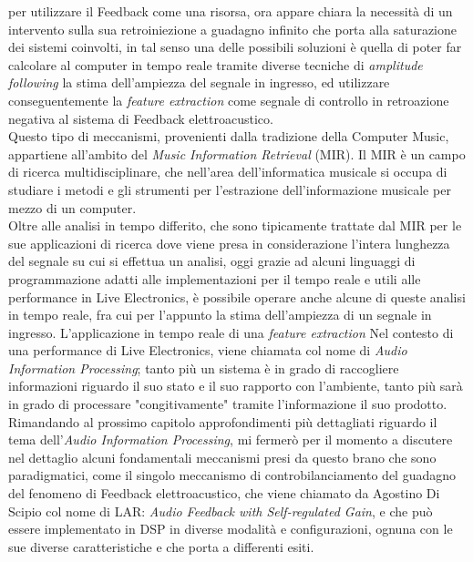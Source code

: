 per utilizzare il Feedback come una risorsa,
ora appare chiara la necessità di un intervento sulla sua retroiniezione a guadagno infinito 
che porta alla saturazione dei sistemi coinvolti, 
in tal senso una delle possibili soluzioni è quella di poter far calcolare
al computer in tempo reale tramite diverse tecniche di \textit{amplitude following} la stima dell'ampiezza
del segnale in ingresso, ed utilizzare conseguentemente la \textit{feature extraction} 
come segnale di controllo in retroazione negativa al sistema di Feedback elettroacustico. \\
Questo tipo di meccanismi, provenienti dalla tradizione della Computer Music, appartiene 
all'ambito del \textit{Music Information Retrieval} (MIR).
Il MIR è un campo di ricerca multidisciplinare, che nell'area dell’informatica musicale si occupa di
studiare i metodi e gli strumenti per l’estrazione dell’informazione musicale per mezzo di un
computer. \\
Oltre alle analisi in tempo differito, che sono tipicamente trattate dal MIR
per le sue applicazioni di ricerca dove viene presa in considerazione
l’intera lunghezza del segnale su cui si effettua un analisi, 
oggi grazie ad alcuni linguaggi di programmazione
adatti alle implementazioni per il tempo reale e utili alle
performance in Live Electronics, è possibile operare anche alcune
di queste analisi in tempo reale, fra cui per l'appunto la stima dell'ampiezza
di un segnale in ingresso.
L'applicazione in tempo reale di una \textit{feature extraction} 
Nel contesto di una performance di Live Electronics, viene chiamata col nome di
\textit{Audio Information Processing};
tanto più un sistema è in grado di raccogliere informazioni riguardo
il suo stato e il suo rapporto con l'ambiente, tanto più sarà in grado di
processare "congitivamente" tramite l'informazione il suo prodotto. \\
Rimandando al prossimo capitolo approfondimenti più dettagliati riguardo il tema 
dell'\textit{Audio Information Processing}, mi fermerò per il momento a discutere 
nel dettaglio alcuni fondamentali meccanismi presi da questo brano che sono paradigmatici,
come il singolo meccanismo di controbilanciamento del guadagno
del fenomeno di Feedback elettroacustico, che viene chiamato da Agostino Di Scipio col nome di 
LAR: \textit{Audio Feedback with Self-regulated Gain},
e che può essere implementato in DSP in diverse modalità e configurazioni,
ognuna con le sue diverse caratteristiche e che porta a differenti esiti. \\


